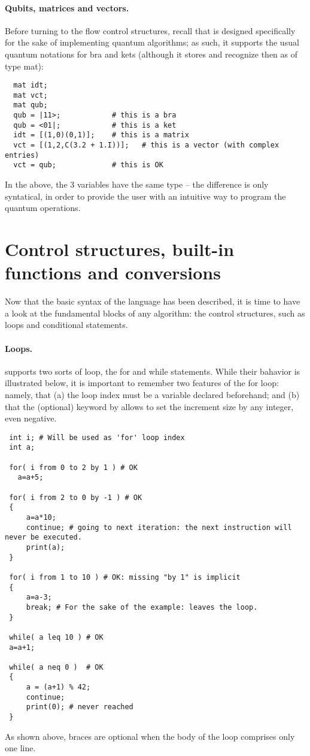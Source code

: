 \paragraph{Qubits, matrices and vectors.} Before turning to the flow control structures, recall that \QL is designed specifically for the sake of implementing quantum algorithms; as such, it supports the usual quantum notations for bra and kets (although it stores and recognize then as of type \textsf{mat}):
\begin{lstlisting}
  mat idt;
  mat vct;
  mat qub;
  qub = |11>;            # this is a bra
  qub = <01|;            # this is a ket
  idt = [(1,0)(0,1)];    # this is a matrix
  vct = [(1,2,C(3.2 + 1.I))];   # this is a vector (with complex entries)
  vct = qub;             # this is OK
\end{lstlisting}
In the above, the 3 variables have the same type -- the difference is only syntatical, in order to provide the user with an intuitive way to program the quantum operations.


\section{Control structures, built-in functions and conversions}
Now that the basic syntax of the language has been described, it is time to have a look at the fundamental blocks of any algorithm: the control structures, such as loops and conditional statements. 

\paragraph{Loops.} \QL supports two sorts of loop, the \textsf{for} and \textsf{while} statements. While their bahavior is illustrated below, it is important to remember two features of the \textsf{for} loop: namely, that \textsf{(a)} the loop index must be a variable declared beforehand; and \textsf{(b)} that the (optional) keyword \textsf{by} allows to set the increment size by any integer, even negative.

\begin{lstlisting}
 int i; # Will be used as 'for' loop index
 int a;

 for( i from 0 to 2 by 1 ) # OK
   a=a+5;

 for( i from 2 to 0 by -1 ) # OK
 {
     a=a*10;
     continue; # going to next iteration: the next instruction will never be executed.
     print(a);
 }
 
 for( i from 1 to 10 ) # OK: missing "by 1" is implicit
 {
     a=a-3;
     break; # For the sake of the example: leaves the loop.
 }
 
 while( a leq 10 ) # OK
 a=a+1;
 
 while( a neq 0 )  # OK
 {
     a = (a+1) % 42;
     continue;
     print(0); # never reached
 }
\end{lstlisting}
As shown above, braces are optional when the body of the loop comprises only one line.

